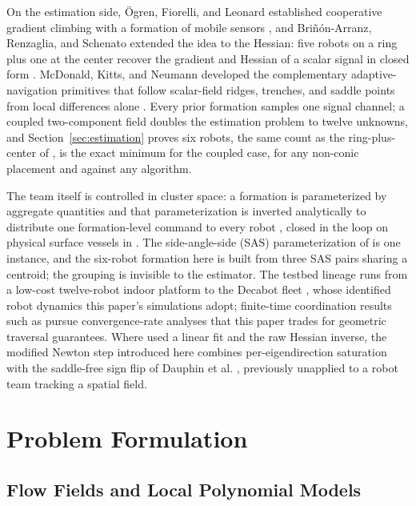 \documentclass[lettersize,journal]{IEEEtran}
\begin{document}
On the estimation side, \"{O}gren, Fiorelli, and Leonard established
cooperative gradient climbing with a formation of mobile sensors
\cite{26}, and Bri\~{n}\'{o}n-Arranz, Renzaglia, and Schenato extended
the idea to the Hessian: five robots on a ring plus one at the center
recover the gradient and Hessian of a scalar signal in closed form
\cite{15}. McDonald, Kitts, and Neumann developed the complementary
adaptive-navigation primitives that follow scalar-field ridges,
trenches, and saddle points from local differences alone
\cite{27,28,29}. Every prior formation samples one signal channel; a
coupled two-component field doubles the estimation problem to twelve
unknowns, and Section~\ref{sec:estimation} proves six robots, the same
count as the ring-plus-center of \cite{15}, is the exact minimum for
the coupled case, for any non-conic placement and against any
algorithm.

The team itself is controlled in cluster space: a formation is
parameterized by aggregate quantities and that parameterization is
inverted analytically to distribute one formation-level command to
every robot \cite{30}, closed in the loop on physical surface vessels
in \cite{31}. The side-angle-side (SAS) parameterization of \cite{14}
is one instance, and the six-robot formation here is built from three
SAS pairs sharing a centroid; the grouping is invisible to the
estimator. The testbed lineage runs from a low-cost twelve-robot indoor
platform \cite{32} to the Decabot fleet \cite{33}, whose identified
robot dynamics this paper's simulations adopt; finite-time coordination
results such as \cite{34} pursue convergence-rate analyses that this
paper trades for geometric traversal guarantees. Where \cite{14} used a
linear fit and \cite{15} the raw Hessian inverse, the modified Newton
step introduced here combines per-eigendirection saturation with the
saddle-free sign flip of Dauphin et al. \cite{35}, previously unapplied
to a robot team tracking a spatial field.


\section{Problem Formulation}
\label{sec:detj_field}

\subsection{Flow Fields and Local Polynomial Models}
\end{document}
